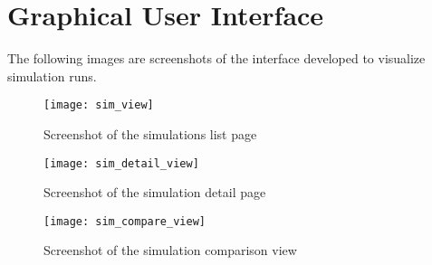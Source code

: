 \chapter{Graphical User Interface} \label{ap1:interface} %

The following images are screenshots of the interface developed to visualize 
simulation runs.

\begin{figure}
    \begin{center}
        \leavevmode
        \texttt{[image: sim\_view]}
        \caption{Screenshot of the simulations list page}
        \label{fig:sim_view}
    \end{center}
\end{figure}

\begin{figure}[p]
    \begin{center}
        \leavevmode
        \texttt{[image: sim\_detail\_view]}
        \caption{Screenshot of the simulation detail page}
        \label{fig:sim_detail_view}
    \end{center}
\end{figure}

\begin{figure}[p]
    \begin{center}
        \leavevmode
        \texttt{[image: sim\_compare\_view]}
        \caption{Screenshot of the simulation comparison view}
        \label{fig:sim_compare_view}
    \end{center}
\end{figure}

